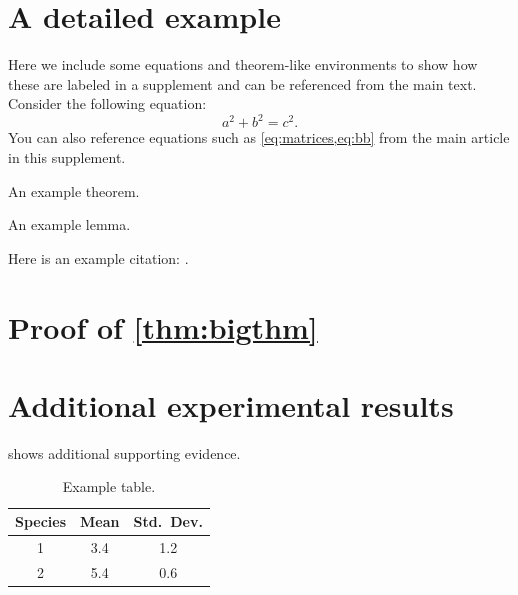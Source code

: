 \documentclass[review,supplement,hidelinks,onefignum,onetabnum]{siamart250106}
\begin{document}
\maketitle

\section{A detailed example}

Here we include some equations and theorem-like environments to show
how these are labeled in a supplement and can be referenced from the
main text.
Consider the following equation:
\begin{equation}
  \label{eq:suppa}
  a^2 + b^2 = c^2.
\end{equation}
You can also reference equations such as \cref{eq:matrices,eq:bb} 
from the main article in this supplement.

\lipsum[100-101]

\begin{theorem}
An example theorem.
\end{theorem}

\lipsum[102]
 
\begin{lemma}
An example lemma.
\end{lemma}

\lipsum[103-105]

Here is an example citation: \cite{KoMa14}.

\section[Proof of Thm]{Proof of \cref{thm:bigthm}}
\label{sec:proof}

\lipsum[106-112]

\section{Additional experimental results}
 shows additional
supporting evidence. 

\begin{table}[htbp]
\footnotesize
  \caption{Example table.}\label{tab:smfoo}
\begin{center}
  \begin{tabular}{|c|c|c|} \hline
   Species & \bf Mean & \bf Std.~Dev. \\ \hline
    1 & 3.4 & 1.2 \\
    2 & 5.4 & 0.6 \\ \hline
  \end{tabular}
\end{center}
\end{table}




\end{document}
